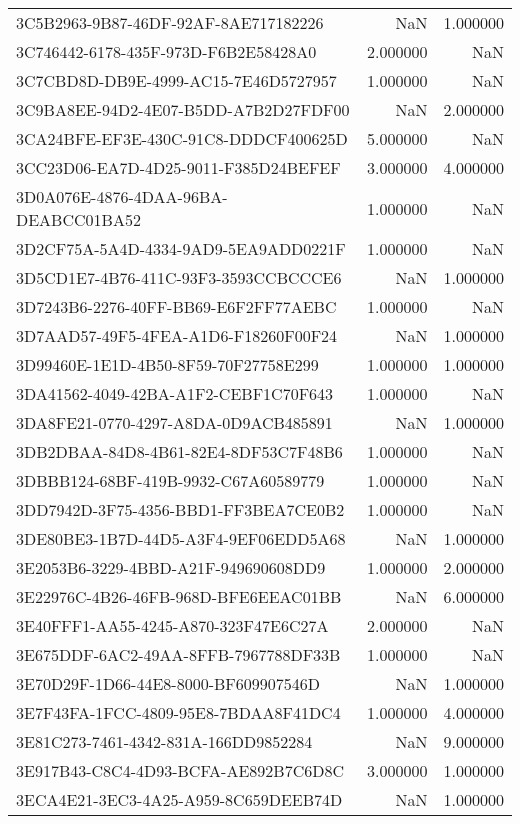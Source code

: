 \begin{tabular}{lrr}
3C5B2963-9B87-46DF-92AF-8AE717182226 & NaN & 1.000000 \\
3C746442-6178-435F-973D-F6B2E58428A0 & 2.000000 & NaN \\
3C7CBD8D-DB9E-4999-AC15-7E46D5727957 & 1.000000 & NaN \\
3C9BA8EE-94D2-4E07-B5DD-A7B2D27FDF00 & NaN & 2.000000 \\
3CA24BFE-EF3E-430C-91C8-DDDCF400625D & 5.000000 & NaN \\
3CC23D06-EA7D-4D25-9011-F385D24BEFEF & 3.000000 & 4.000000 \\
3D0A076E-4876-4DAA-96BA-DEABCC01BA52 & 1.000000 & NaN \\
3D2CF75A-5A4D-4334-9AD9-5EA9ADD0221F & 1.000000 & NaN \\
3D5CD1E7-4B76-411C-93F3-3593CCBCCCE6 & NaN & 1.000000 \\
3D7243B6-2276-40FF-BB69-E6F2FF77AEBC & 1.000000 & NaN \\
3D7AAD57-49F5-4FEA-A1D6-F18260F00F24 & NaN & 1.000000 \\
3D99460E-1E1D-4B50-8F59-70F27758E299 & 1.000000 & 1.000000 \\
3DA41562-4049-42BA-A1F2-CEBF1C70F643 & 1.000000 & NaN \\
3DA8FE21-0770-4297-A8DA-0D9ACB485891 & NaN & 1.000000 \\
3DB2DBAA-84D8-4B61-82E4-8DF53C7F48B6 & 1.000000 & NaN \\
3DBBB124-68BF-419B-9932-C67A60589779 & 1.000000 & NaN \\
3DD7942D-3F75-4356-BBD1-FF3BEA7CE0B2 & 1.000000 & NaN \\
3DE80BE3-1B7D-44D5-A3F4-9EF06EDD5A68 & NaN & 1.000000 \\
3E2053B6-3229-4BBD-A21F-949690608DD9 & 1.000000 & 2.000000 \\
3E22976C-4B26-46FB-968D-BFE6EEAC01BB & NaN & 6.000000 \\
3E40FFF1-AA55-4245-A870-323F47E6C27A & 2.000000 & NaN \\
3E675DDF-6AC2-49AA-8FFB-7967788DF33B & 1.000000 & NaN \\
3E70D29F-1D66-44E8-8000-BF609907546D & NaN & 1.000000 \\
3E7F43FA-1FCC-4809-95E8-7BDAA8F41DC4 & 1.000000 & 4.000000 \\
3E81C273-7461-4342-831A-166DD9852284 & NaN & 9.000000 \\
3E917B43-C8C4-4D93-BCFA-AE892B7C6D8C & 3.000000 & 1.000000 \\
3ECA4E21-3EC3-4A25-A959-8C659DEEB74D & NaN & 1.000000 \\

\end{tabular}
